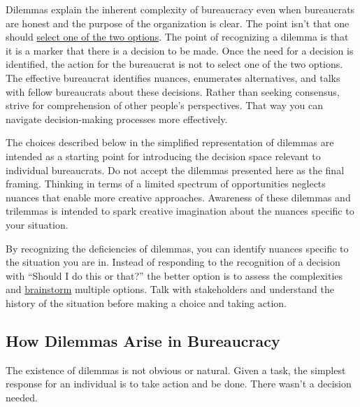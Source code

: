 Dilemmas explain the inherent complexity of bureaucracy even when bureaucrats are honest and the purpose of the organization is clear.
The point isn't that one should \href{https://en.wikipedia.org/wiki/False_dilemma}{select one of the two options}. 
\iftoggle{WPinmargin}{\marginpar{$>$Wikipedia: False\\dilemma}}{}
The point of recognizing a dilemma is that it is a marker that there is a decision to be made.
Once the need for a decision is identified, the action for the bureaucrat is not to select one of the two options. The effective bureaucrat identifies nuances, enumerates alternatives, and talks with fellow bureaucrats about these decisions. Rather than seeking consensus, strive for comprehension of other people's perspectives. That way you can navigate decision-making processes more effectively.

The choices described below in the simplified representation of dilemmas are intended as a starting point for introducing the decision space relevant to individual bureaucrats. Do not accept the dilemmas presented here as the final framing. Thinking in terms of a limited spectrum of opportunities neglects nuances that enable more creative approaches. 
Awareness of these dilemmas and trilemmas is intended to spark creative imagination about the nuances specific to your situation.

By recognizing the deficiencies of dilemmas, you can identify nuances specific to the situation you are in. Instead of responding to the recognition of a decision with ``Should I do this or that?'' the better option is to assess the complexities and \href{https://en.wikipedia.org/wiki/Brainstorming}{brainstorm}
\iftoggle{WPinmargin}{\marginpar{$>$Wikipedia: Brainstorming}}{}
multiple options. Talk with stakeholders and understand the history of the situation before making a choice and taking action.



\subsection*{How Dilemmas Arise in Bureaucracy}

The existence of dilemmas is not obvious or natural. 
Given a task, the simplest response for an individual is to take action and be done. 
There wasn't a decision needed.

